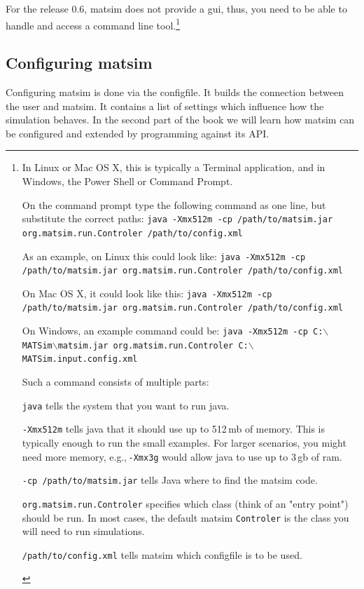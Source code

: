 For the release 0.6, \gls{matsim} does not provide a \gls{gui}, thus, you need to be able to handle and access a command line tool.\footnote{%
%
\baselineskip
\parindent0pt
%
In Linux or Mac OS X, this is typically a Terminal application, and in Windows, the Power Shell or Command Prompt.

On the command prompt type the following command as one line, but substitute the correct paths: 
\lstinline|java -Xmx512m -cp /path/to/matsim.jar org.matsim.run.Controler /path/to/config.xml|

As an example, on Linux this could look like: 
\lstinline|java -Xmx512m -cp /path/to/matsim.jar org.matsim.run.Controler /path/to/config.xml|

On Mac OS X, it could look like this: 
\lstinline|java -Xmx512m -cp /path/to/matsim.jar org.matsim.run.Controler /path/to/config.xml|

On Windows, an example command could be: 
\protect\lstinline{java -Xmx512m -cp C:}$\backslash$\lstinline{MATSim}$\backslash$\lstinline{matsim.jar org.matsim.run.Controler C:}$\backslash$\lstinline{MATSim.input.config.xml}

Such a command consists of multiple parts:
\begin{compactitem}
\item \lstinline|java| tells the system that you want to run \gls{java}.
\item \lstinline|-Xmx512m| tells \gls{java} that it should use up to 512\,\gls{mb} of memory. This is typically enough to run the small examples. For larger \glspl{scenario}, you might need more memory, e.g.,\,\lstinline|-Xmx3g| would allow \gls{java} to use up to 3\,\gls{gb} of \gls{ram}.
\item \lstinline|-cp /path/to/matsim.jar| tells Java where to find the \gls{matsim} code.
\item \lstinline|org.matsim.run.Controler| specifies which class (think of an "entry point") should be run. In most cases, the default \gls{matsim} \lstinline|Controler| is the class you will need to run simulations.
\item \lstinline|/path/to/config.xml| tells \gls{matsim} which \gls{configfile} is to be used. 
\end{compactitem}

}


\subsection{Configuring \protect\gls{matsim}}
\label{sec:config}
Configuring \gls{matsim} is 
done via the \gls{configfile}. It builds the connection between the user and \gls{matsim}. It contains a list of settings which influence how the simulation behaves. In the second part of the book we will learn how \gls{matsim} can be configured and extended by programming against its API.

